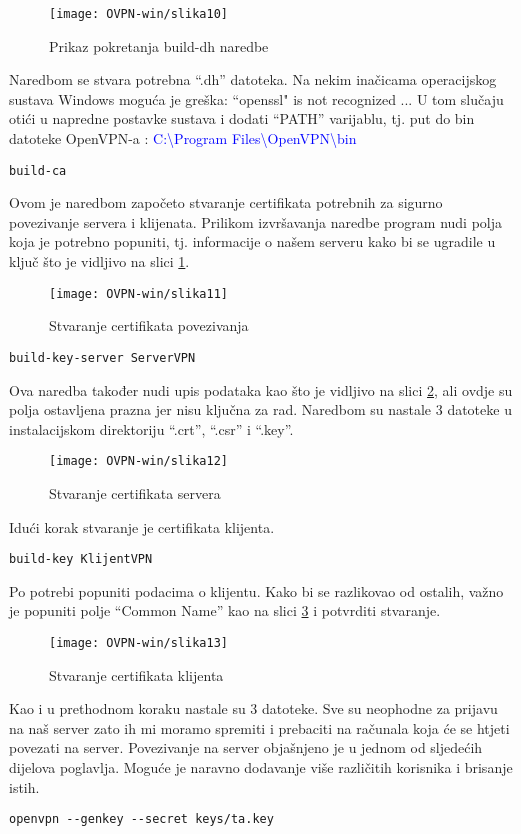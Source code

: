\begin{figure}[h!]
	\centering
     \texttt{[image: OVPN-win/slika10]}
     \caption{Prikaz pokretanja build-dh naredbe}
\end{figure}
\FloatBarrier
Naredbom se stvara potrebna ``.dh'' datoteka. Na nekim inačicama operacijskog sustava Windows moguća je greška: ``openssl" is not recognized ...\smallbreak
U tom slučaju otići u napredne postavke sustava i dodati ``PATH'' varijablu, tj. put do bin datoteke OpenVPN-a :
\small\textcolor{blue}{C:\textbackslash Program Files\textbackslash OpenVPN\textbackslash bin}
\begin{lstlisting}
build-ca
\end{lstlisting}
Ovom je naredbom započeto stvaranje certifikata potrebnih za sigurno povezivanje servera i klijenata. Prilikom izvršavanja naredbe program nudi polja koja je potrebno popuniti, tj. informacije o našem serveru kako bi se ugradile u ključ što je vidljivo na slici \ref{fig:ca-open}.
\begin{figure}[h!]
	\centering
     \texttt{[image: OVPN-win/slika11]}
     \caption{Stvaranje certifikata povezivanja}
     \label{fig:ca-open}
\end{figure}
\FloatBarrier
\begin{lstlisting}
build-key-server ServerVPN
\end{lstlisting}
Ova naredba također nudi upis podataka kao što je vidljivo na slici \ref{fig:serverca-open}, ali ovdje su polja ostavljena prazna jer nisu ključna za rad. Naredbom su nastale 3 datoteke u instalacijskom direktoriju ``.crt'',  ``.csr'' i ``.key''.
\begin{figure}[h!]
	\centering
     \texttt{[image: OVPN-win/slika12]}
     \caption{Stvaranje certifikata servera}
     \label{fig:serverca-open}
\end{figure}
\FloatBarrier
Idući korak stvaranje je certifikata klijenta.
\begin{lstlisting}
build-key KlijentVPN
\end{lstlisting}
Po potrebi popuniti podacima o klijentu. Kako bi se razlikovao od ostalih, važno je popuniti polje ``Common Name'' kao na slici \ref{fig:klijent-open} i potvrditi stvaranje.
\begin{figure}[h!]
	\centering
     \texttt{[image: OVPN-win/slika13]}
     \caption{Stvaranje certifikata klijenta}
     \label{fig:klijent-open}
\end{figure}
\FloatBarrier
Kao i u prethodnom koraku nastale su 3 datoteke. Sve su neophodne za prijavu na naš server zato ih mi moramo spremiti i prebaciti na računala koja će se htjeti povezati na server. Povezivanje na server objašnjeno je u jednom od sljedećih dijelova poglavlja.\smallbreak
Moguće je naravno dodavanje više različitih korisnika i brisanje istih.
\begin{lstlisting}
openvpn --genkey --secret keys/ta.key
\end{lstlisting}


